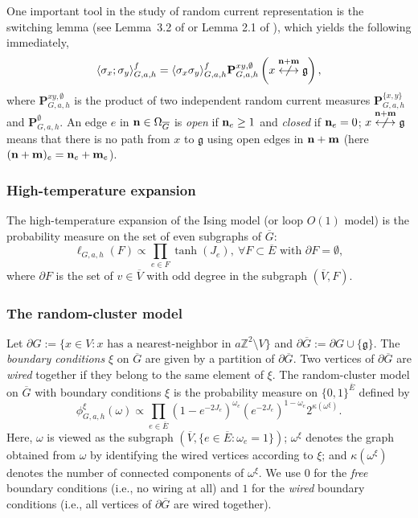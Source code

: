 \documentclass[article,12pt,reqno]{amsart}
\begin{document}
One important tool in the study of random current representation is the switching lemma (see Lemma~3.2 of \cite{Aiz82} or Lemma 2.1 of \cite{ABF87}), which yields the following immediately, %
\begin{equation}\label{eq:truncatedtwopoint}
	\langle \sigma_x; \sigma_y \rangle^f_{G, a,h}=\langle \sigma_x \sigma_y \rangle^f_{G,a,h} \mathbf{P}^{xy,\emptyset}_{G,a,h}\left(x \overset{{\bf n} +{\bf m}} {\centernot \longleftrightarrow} \mathfrak{g}\right),
\end{equation}
where $\mathbf{P}^{xy,\emptyset}_{G,a,h}$ is the product of two independent random current measures $\mathbf{P}^{\{x, y\}}_{G,a,h}$ and $\mathbf{P}^{\emptyset}_{G,a,h}$. An edge $e$ in ${\bf n}\in \Omega_{\overline{G}}$ is {\it open} if ${\bf n}_e\geq 1$ and {\it closed} if ${\bf n}_e=0$; $x \overset{{\bf n} +{\bf m}} {\centernot \longleftrightarrow} \mathfrak{g}$ means that there is no path from $x$ to $\mathfrak{g}$ using open edges in ${\bf n}+{\bf m}$ (here $({\bf n}+{\bf m})_e={\bf n}_e+{\bf m}_e$).

\subsubsection*{High-temperature expansion}
The high-temperature expansion of the Ising model (or loop $O(1)$ model) is the probability measure on the set of even subgraphs of $\overline{G}$:
\[\ell_{G,a,h}(F) \propto \prod_{e\in F} \tanh(J_e),~\forall F\subset \overline{E} \text{ with }\partial F=\emptyset,\]
where $\partial F$ is the set of $v\in \overline{V}$ with odd degree in the subgraph $(\overline{V},F)$.

\subsubsection*{The random-cluster model}
Let $\partial G:=\{x\in V: x \text{ has a nearest-neighbor in }a\mathbb{Z}^2\setminus V \}$ and $\partial \overline{G}:=\partial G\cup\{\mathfrak{g}\}$. The {\it boundary conditions} $\xi$ on $\overline{G}$ are given by a partition of $\partial\overline{G}$. Two vertices of $\partial\overline{G}$ are {\it wired} together if they belong to the same element of $\xi$. The random-cluster model on $\overline{G}$ with boundary conditions $\xi$ is the probability measure on $\{0,1\}^{\overline{E}}$ defined by
\[\phi^{\xi}_{G,a,h}(\omega) \propto \prod_{e\in \overline{E}}(1-e^{-2J_e})^{\omega_e}(e^{-2J_e})^{1-\omega_e}2^{\kappa(\omega^{\xi})}.\]
Here, $\omega$ is viewed as the subgraph $(\overline{V},\{e\in \overline{E}: \omega_e=1\})$; $\omega^{\xi}$ denotes the graph obtained from $\omega$ by identifying the wired vertices according to $\xi$; and $\kappa(\omega^{\xi})$ denotes the number of connected components of $\omega^{\xi}$. We use $0$ for the {\it free} boundary conditions (i.e., no wiring at all) and $1$ for the {\it wired} boundary conditions (i.e., all vertices of $\partial \overline{G}$ are wired together).
\end{document}
